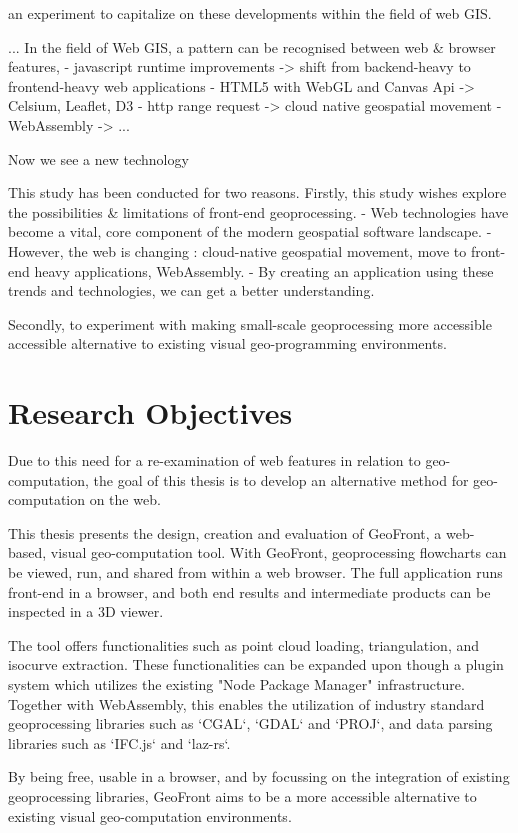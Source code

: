 an experiment to capitalize on these developments within the field of web GIS. 


...
In the field of Web GIS, a pattern can be recognised between web \& browser features,  
- javascript runtime improvements -> shift from backend-heavy to frontend-heavy web applications
- HTML5 with WebGL and Canvas Api -> Celsium, Leaflet, D3
- http range request -> cloud native geospatial movement 
- WebAssembly -> ...

Now we see a new technology 

This study has been conducted for two reasons.
Firstly, this study wishes explore the possibilities \& limitations of front-end geoprocessing.
  - Web technologies have become a vital, core component of the modern geospatial software landscape.
  - However, the web is changing : cloud-native geospatial movement, move to front-end heavy applications, WebAssembly. 
  - By creating an application using these trends and technologies, we can get a better understanding.

Secondly, to experiment with making small-scale geoprocessing more accessible
accessible alternative to existing visual geo-programming environments.

\section{Research Objectives}
Due to this need for a re-examination of web features in relation to geo-computation, 
the goal of this thesis is to develop an alternative method for geo-computation on the web.

This thesis presents the design, creation and evaluation of GeoFront, a web-based, visual geo-computation tool. 
With GeoFront, geoprocessing flowcharts can be viewed, run, and shared from within a web browser.  
The full application runs front-end in a browser, and both end results and intermediate products can be inspected in a 3D viewer.

The tool offers functionalities such as point cloud loading, triangulation, and isocurve extraction.
These functionalities can be expanded upon though a plugin system which utilizes the existing "Node Package Manager" infrastructure.
Together with WebAssembly, this enables the utilization of industry standard geoprocessing libraries such as `CGAL`, `GDAL` and `PROJ`, and data parsing libraries such as `IFC.js` and `laz-rs`.

By being free, usable in a browser, and by focussing on the integration of existing geoprocessing libraries, GeoFront aims to be a more accessible alternative to existing visual geo-computation environments.


